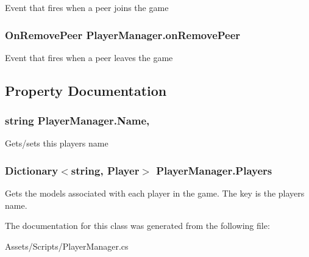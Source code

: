 Event that fires when a peer joins the game 

\subsubsection[{\texorpdfstring{on\+Remove\+Peer}{onRemovePeer}}]{\setlength{\rightskip}{0pt plus 5cm}On\+Remove\+Peer Player\+Manager.\+on\+Remove\+Peer}\hypertarget{class_player_manager_a88f01e2ed833375b7b95ae3d1272baf0}{}\label{class_player_manager_a88f01e2ed833375b7b95ae3d1272baf0}


Event that fires when a peer leaves the game 



\subsection{Property Documentation}
\subsubsection[{\texorpdfstring{Name}{Name}}]{\setlength{\rightskip}{0pt plus 5cm}string Player\+Manager.\+Name\hspace{0.3cm}{\ttfamily [get]}, {\ttfamily [set]}}\hypertarget{class_player_manager_acf881bd65193d0c3b7089f014ae22057}{}\label{class_player_manager_acf881bd65193d0c3b7089f014ae22057}


Gets/sets this player\textquotesingle{}s name 

\subsubsection[{\texorpdfstring{Players}{Players}}]{\setlength{\rightskip}{0pt plus 5cm}Dictionary$<$string, Player$>$ Player\+Manager.\+Players\hspace{0.3cm}{\ttfamily [get]}}\hypertarget{class_player_manager_a6fcc25b412f01d734a22624aa2d3e016}{}\label{class_player_manager_a6fcc25b412f01d734a22624aa2d3e016}


Gets the models associated with each player in the game. The key is the player\textquotesingle{}s name. 



The documentation for this class was generated from the following file\+:\begin{DoxyCompactItemize}
\item 
Assets/\+Scripts/Player\+Manager.\+cs\end{DoxyCompactItemize}
